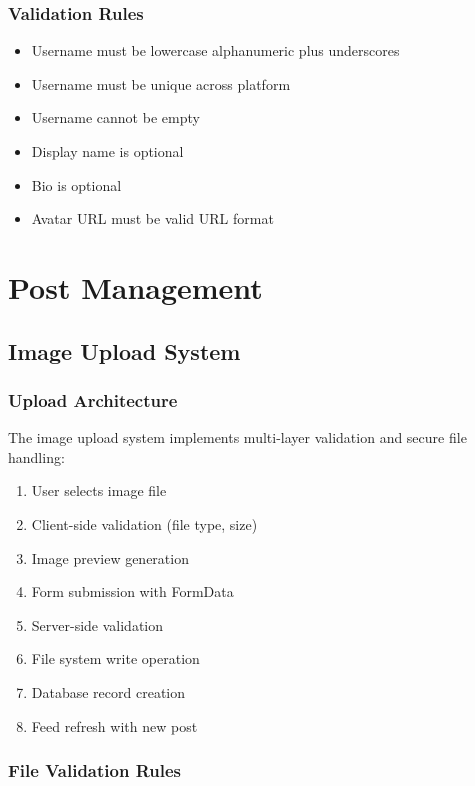 \documentclass[12pt,a4paper]{report}
\begin{document}
\subsection{Validation Rules}

\begin{itemize}
    \item Username must be lowercase alphanumeric plus underscores
    \item Username must be unique across platform
    \item Username cannot be empty
    \item Display name is optional
    \item Bio is optional
    \item Avatar URL must be valid URL format
\end{itemize}

\chapter{Post Management}

\section{Image Upload System}

\subsection{Upload Architecture}

The image upload system implements multi-layer validation and secure file handling:

\begin{enumerate}
    \item User selects image file
    \item Client-side validation (file type, size)
    \item Image preview generation
    \item Form submission with FormData
    \item Server-side validation
    \item File system write operation
    \item Database record creation
    \item Feed refresh with new post
\end{enumerate}

\subsection{File Validation Rules}
\end{document}

